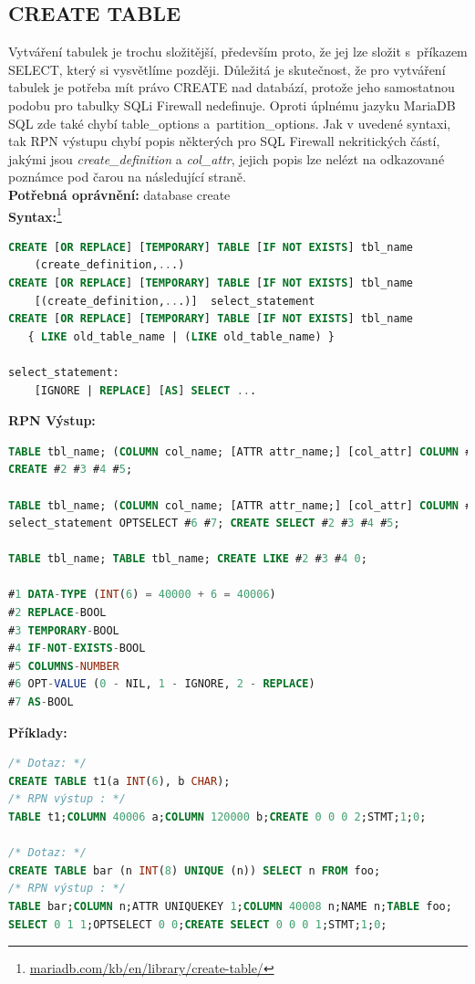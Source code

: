 \subsection{CREATE TABLE} \label{subsec:6:createtbl}
Vytváření tabulek je trochu složitější, především proto, že jej lze složit s~příkazem SELECT, který si vysvětlíme později. Důležitá je skutečnost, 
že pro vytváření tabulek je potřeba mít právo CREATE nad databází, protože jeho samostatnou podobu pro tabulky SQLi Firewall nedefinuje.
Oproti úplnému jazyku MariaDB SQL zde také chybí table\_options a~partition\_options. Jak v uvedené syntaxi, tak RPN výstupu chybí popis
některých pro SQL Firewall nekritických částí, jakými jsou \textit{create\_definition} a \textit{col\_attr}, jejich popis lze
nelézt na odkazované poznámce pod čarou na následující straně. \\

\textbf{Potřebná oprávnění:} database create \\
\newpage
\textbf{Syntax:}\footnote{\url{mariadb.com/kb/en/library/create-table/}}
\begin{lstlisting}[language=sql]
CREATE [OR REPLACE] [TEMPORARY] TABLE [IF NOT EXISTS] tbl_name
    (create_definition,...)
CREATE [OR REPLACE] [TEMPORARY] TABLE [IF NOT EXISTS] tbl_name
    [(create_definition,...)]  select_statement
CREATE [OR REPLACE] [TEMPORARY] TABLE [IF NOT EXISTS] tbl_name
   { LIKE old_table_name | (LIKE old_table_name) }

select_statement:
    [IGNORE | REPLACE] [AS] SELECT ...
\end{lstlisting}
\vspace*{\baselineskip}
\textbf{RPN Výstup:}
\begin{lstlisting}[language=sql]
TABLE tbl_name; (COLUMN col_name; [ATTR attr_name;] [col_attr] COLUMN #1; ...)
CREATE #2 #3 #4 #5;

TABLE tbl_name; (COLUMN col_name; [ATTR attr_name;] [col_attr] COLUMN #1; ...)
select_statement OPTSELECT #6 #7; CREATE SELECT #2 #3 #4 #5;

TABLE tbl_name; TABLE tbl_name; CREATE LIKE #2 #3 #4 0;

#1 DATA-TYPE (INT(6) = 40000 + 6 = 40006)
#2 REPLACE-BOOL
#3 TEMPORARY-BOOL
#4 IF-NOT-EXISTS-BOOL
#5 COLUMNS-NUMBER
#6 OPT-VALUE (0 - NIL, 1 - IGNORE, 2 - REPLACE)
#7 AS-BOOL
\end{lstlisting}
\vspace*{\baselineskip}
\textbf{Příklady:}
\begin{lstlisting}[language=sql]
/* Dotaz: */
CREATE TABLE t1(a INT(6), b CHAR);
/* RPN výstup : */
TABLE t1;COLUMN 40006 a;COLUMN 120000 b;CREATE 0 0 0 2;STMT;1;0;

/* Dotaz: */
CREATE TABLE bar (n INT(8) UNIQUE (n)) SELECT n FROM foo;
/* RPN výstup : */
TABLE bar;COLUMN n;ATTR UNIQUEKEY 1;COLUMN 40008 n;NAME n;TABLE foo;
SELECT 0 1 1;OPTSELECT 0 0;CREATE SELECT 0 0 0 1;STMT;1;0;
\end{lstlisting}

